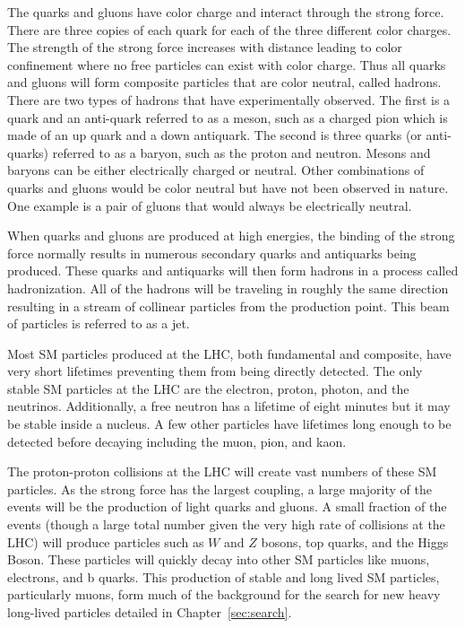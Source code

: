 The quarks and gluons have color charge and interact through the strong force. There are three copies of each quark for each of the three different color charges.
The strength of the strong force increases with distance leading to color confinement where no free particles can exist with color charge.
Thus all quarks and gluons will form composite particles that are color neutral, called hadrons. There are two types of hadrons that have experimentally observed.
The first is a quark and an anti-quark referred to as a meson, such as a charged pion which is made of an up quark and a down antiquark.
The second is three quarks (or anti-quarks) referred to as a baryon, such as the proton and neutron.
Mesons and baryons can be either electrically charged or neutral.
Other combinations of quarks and gluons would be color neutral but have not been observed in nature.
One example is a pair of gluons that would always be electrically neutral.

When quarks and gluons are produced at high energies, the binding of the strong force normally results in numerous secondary quarks and antiquarks being produced.
These quarks and antiquarks will then form hadrons in a process called hadronization.
All of the hadrons will be traveling in roughly the same direction resulting in a stream of collinear particles from the production point.
This beam of particles is referred to as a jet.

Most SM particles produced at the LHC, both fundamental and composite, have very short lifetimes preventing them from being directly detected. The only stable SM particles
at the LHC are the electron, proton, photon, and the neutrinos. Additionally, a free neutron has a lifetime of eight minutes but it may be stable inside a nucleus.
A few other particles have lifetimes long enough to be detected before decaying including the muon, pion, and kaon.

The proton-proton collisions at the LHC will create vast numbers of these SM particles. As the strong force has the largest coupling,
a large majority of the events will be the production of light quarks and gluons. A small fraction of the events (though a large total number given the very
high rate of collisions at the LHC) will produce particles such as $W$ and $Z$ bosons, top quarks, and the Higgs Boson.
These particles will quickly decay into other SM particles like muons, electrons, and b quarks. This production of stable and long lived SM particles,
particularly muons, form much of the background for the search for new heavy long-lived particles detailed in Chapter~\ref{sec:search}.

